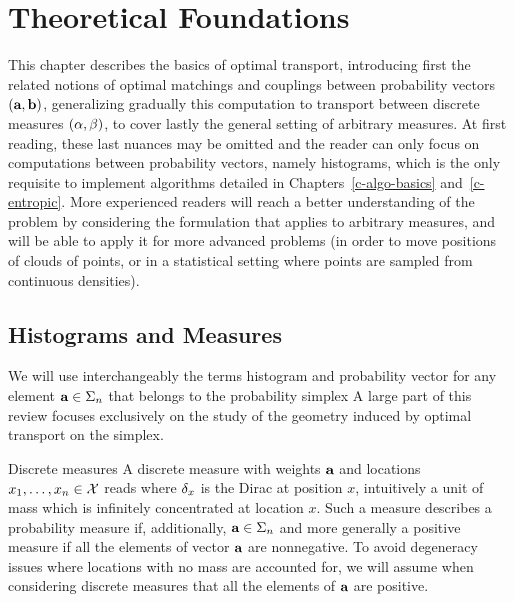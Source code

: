 
\chapter{Theoretical Foundations}
\label{c-continuous}

This chapter describes the basics of optimal transport, introducing first the related notions of optimal matchings and couplings between probability vectors $(\mathrm{\textbf{a}},\mathrm{\textbf{b}})$, generalizing gradually this computation to transport between discrete measures $(\alpha,\beta)$, to cover lastly the general setting of arbitrary measures. At first reading, these last nuances may be omitted and the reader can only focus on computations between probability vectors, namely histograms, which is the only requisite to implement algorithms detailed in Chapters~\ref{c-algo-basics} and~\ref{c-entropic}. More experienced readers will reach a better understanding of the problem by considering the formulation that applies to arbitrary measures, and will be able to apply it for more advanced problems (\eg in order to move positions of clouds of points, or in a statistical setting where points are sampled from continuous densities).

\section{Histograms and Measures}

We will use interchangeably the terms histogram and probability vector for any element $\mathrm{\textbf{a}} \in \Sigma_n$ that belongs to the probability simplex
A large part of this review focuses exclusively on the study of the geometry induced by optimal transport on the simplex. %


\begin{rem1}{Discrete measures}
A discrete measure with weights $\mathrm{\textbf{a}}$ and locations $x_1,\dots,x_n\in\mathcal{X}$ reads
where $\delta_x$ is the Dirac at position $x$, intuitively a unit of mass which is infinitely concentrated at location $x$. Such a measure describes a probability measure if, additionally, $\mathrm{\textbf{a}}\in\Sigma_n$ and more generally a positive measure if all the elements of vector $\mathrm{\textbf{a}}$ are nonnegative. To avoid degeneracy issues where locations with no mass are accounted for, we will assume when considering discrete measures that all the elements of $\mathrm{\textbf{a}}$ are positive.
\end{rem1}




